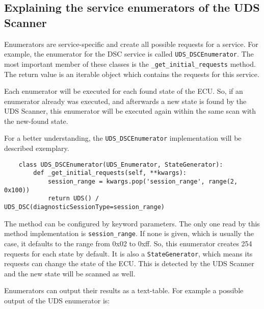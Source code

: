 \subsection{Explaining the service enumerators of the UDS Scanner}


Enumerators are service-specific and create all possible requests for a service.
For example, the enumerator for the DSC service is called \texttt{UDS_DSCEnumerator}. The most important member of these classes is the \texttt{_get_initial_requests} method. The return value is an iterable object which contains the requests for this service.

Each enumerator will be executed for each found state of the ECU. So, if an enumerator already was executed, and afterwards a new state is found by the UDS Scanner, this enumerator will be executed again within the same scan with the new-found state.

For a better understanding, the \texttt{UDS_DSCEnumerator} implementation will be described exemplary.

\begin{samepage}
\begin{verbatim}
    class UDS_DSCEnumerator(UDS_Enumerator, StateGenerator):
        def _get_initial_requests(self, **kwargs):
            session_range = kwargs.pop('session_range', range(2, 0x100))
            return UDS() / UDS_DSC(diagnosticSessionType=session_range)
\end{verbatim}
\end{samepage}

The method can be configured by keyword parameters. The only one read by this method implementation is \texttt{session_range}. If none is given, which is usually the case, it defaults to the range from 0x02 to 0xff. So, this enumerator creates 254 requests for each state by default. It is also a \texttt{StateGenerator}, which means its requests can change the state of the ECU. This is detected by the UDS Scanner and the new state will be scanned as well.

Enumerators can output their results as a text-table. For example a possible output of the UDS enumerator is:

